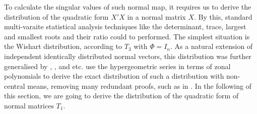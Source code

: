 \documentclass{amsart}
\theoremstyle{definition}
\numberwithin{equation}{section}
\begin{document}
To calculate the singular values of such normal map, it requires us to derive the distribution of the quadratic form $X'X$ in a normal matrix $X$. By this, standard multi-varaite statistical analysis techniques like the determinant, trace, largest and smallest roots and their ratio could to performed. The simplest situation is the Wishart distribution, according to $T_3$ with $\varPhi = I_n$. As a natural extension of independent identically distributed normal vectors, this distribution was further generalised by \cite{anderson1946wishart}, \cite{James1955TheNW}, and \cite{herz1955} etc. \cite{james1960distribution,james1961distribution,james1961zonal,james1968calculation} use the hypergeometric series in terms of zonal polynomials to derive the exact distribution of such a distribution with non-central means, removing many redundant proofs, such as in \cite{Kotz1967ab}. In the following of this section, we are going to derive the distribution of the quadratic form of normal matrices $T_1$. 
\end{document}
